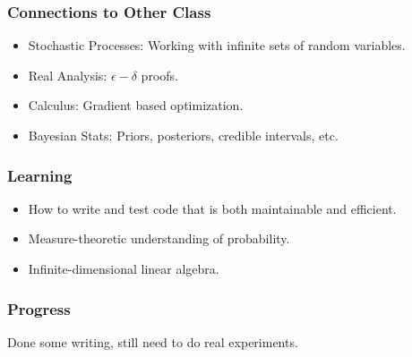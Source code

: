 \documentclass{beamer}
\begin{document}
\begin{frame}
    \frametitle{Connections to Other Class}
    \begin{itemize}
        \item Stochastic Processes: Working with infinite sets of random variables.
        \item Real Analysis: $\epsilon-\delta$ proofs.
        \item Calculus: Gradient based optimization.
        \item Bayesian Stats: Priors, posteriors, credible intervals, etc.
    \end{itemize}
\end{frame}

\begin{frame}
    \frametitle{Learning}

    \begin{itemize}
        \item
            How to write and test code that is both maintainable and efficient.
        \item
            Measure-theoretic understanding of probability.
        \item
            Infinite-dimensional linear algebra.
    \end{itemize}
\end{frame}

\begin{frame}
    \frametitle{Progress}
    Done some writing, still need to do real experiments.
\end{frame}
\end{document}
